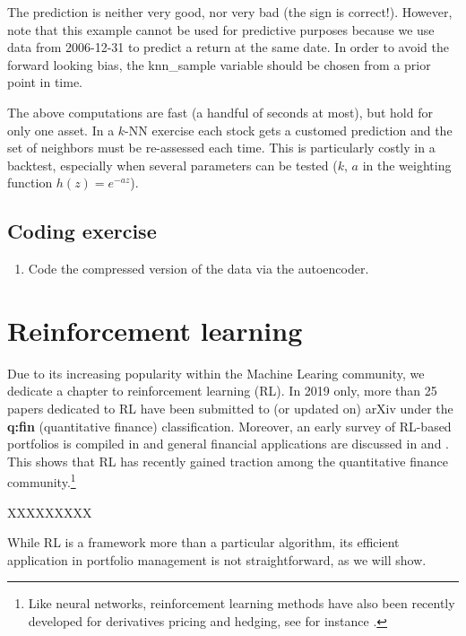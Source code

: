 \documentclass[]{krantz}
\providecommand{\tightlist}{%
  \setlength{\itemsep}{0pt}\setlength{\parskip}{0pt}}
\let\rmarkdownfootnote\footnote%
\def\footnote{\protect\rmarkdownfootnote}
\theoremstyle{definition}
\theoremstyle{definition}
\theoremstyle{definition}
\theoremstyle{remark}
\begin{document}
\normalsize

The prediction is neither very good, nor very bad (the sign is
correct!). However, note that this example cannot be used for predictive
purposes because we use data from 2006-12-31 to predict a return at the
same date. In order to avoid the forward looking bias, the knn\_sample
variable should be chosen from a prior point in time.

The above computations are fast (a handful of seconds at most), but hold
for only one asset. In a \(k\)-NN exercise each stock gets a customed
prediction and the set of neighbors must be re-assessed each time. This
is particularly costly in a backtest, especially when several parameters
can be tested (\(k\), \(a\) in the weighting function \(h(z)=e^{-az}\)).

\hypertarget{coding-exercise}{%
\section{Coding exercise}\label{coding-exercise}}

\begin{enumerate}
\def\labelenumi{\arabic{enumi}.}
\tightlist
\item
  Code the compressed version of the data via the autoencoder.
\end{enumerate}

\hypertarget{RL}{%
\chapter{Reinforcement learning}\label{RL}}

Due to its increasing popularity within the Machine Learing community,
we dedicate a chapter to reinforcement learning (RL). In 2019 only, more
than 25 papers dedicated to RL have been submitted to (or updated on)
arXiv under the \textbf{q:fin} (quantitative finance) classification.
Moreover, an early survey of RL-based portfolios is compiled in
\citet{sato2019model} and general financial applications are discussed
in \citet{kolm2019modern} and \citet{meng2019reinforcement}. This shows
that RL has recently gained traction among the quantitative finance
community.\footnote{Like neural networks, reinforcement learning methods
  have also been recently developed for derivatives pricing and hedging,
  see for instance \citet{kolm2019dynamic}.}

XXXXXXXXX

While RL is a framework more than a particular algorithm, its efficient
application in portfolio management is not straightforward, as we will
show.
\end{document}
